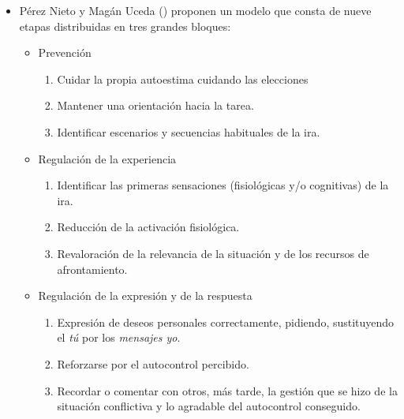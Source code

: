 \begin{itemize}
    \item Pérez Nieto y Magán Uceda (\citeyear{lairama}) proponen un modelo que consta de nueve etapas distribuidas en tres grandes bloques:
    
    \begin{itemize}
        \item Prevención
        \begin{enumerate}
            \item Cuidar la propia autoestima cuidando las elecciones
            \item Mantener una orientación hacia la tarea.
            \item Identificar escenarios y secuencias habituales de la ira.
        \end{enumerate}

        \item Regulación de la experiencia
        \begin{enumerate}
            \item Identificar las primeras sensaciones (fisiológicas y/o cognitivas) de la ira.        
            \item Reducción de la activación fisiológica.
            \item Revaloración de la relevancia de la situación y de los recursos de afrontamiento.
        \end{enumerate}
        \item Regulación de la expresión y de la respuesta
        \begin{enumerate}
            \item Expresión de deseos personales correctamente, pidiendo, sustituyendo el \textit{tú} por los \textit{mensajes yo}.
            \item Reforzarse por el autocontrol percibido.
            \item Recordar o comentar con otros, más tarde, la gestión que se hizo de la situación conflictiva y lo agradable del autocontrol conseguido.
        \end{enumerate}
    \end{itemize}    
    
    
\end{itemize}

